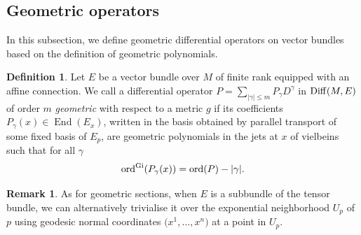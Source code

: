 \documentclass[pdftex]{sigma}
\numberwithin{equation}{section}
\theoremstyle{definition}
\newtheorem{rk}[thm]{Remark}
\newtheorem{defn}[thm]{Definition}
\begin{document}
\subsection{Geometric operators} In this subsection, we define geometric differential operators on vector bundles based on the definition of geometric polynomials.

\begin{defn}\label{defn:geometricdiffop}
 Let $E$ be a vector bundle over $M$ of finite rank equipped with an affine connection. We call a differential operator $P= \sum_{\vert \gamma\vert \leq m} P_\gamma D^\gamma$ in $ {\rm Diff}(M, E)$ of order $m$ {\it geometric} with respect to a metric $g$ if its coefficients
 $P_\gamma (x) \in \operatorname{End}(E_x)$, written in the basis obtained by parallel transport of some fixed basis of $E_p$, are geometric polynomials in the jets at $x$ of vielbeins such that for all $\gamma$
\begin{equation}\label{eq:geomopGi}
		{\rm ord}^{\rm Gi}(P_\gamma(x))={\rm ord}(P)- |\gamma|.
\end{equation}
\end{defn}
\begin{rk} As for geometric sections, when $E$ is a subbundle of the tensor bundle, we can alternatively trivialise it over the exponential neighborhood $U_p$ of $p$ using geodesic normal coordinates $\bigl(x^1, \dots, x^n\bigr)$ at a point in $U_p$.
\end{rk}
\end{document}
